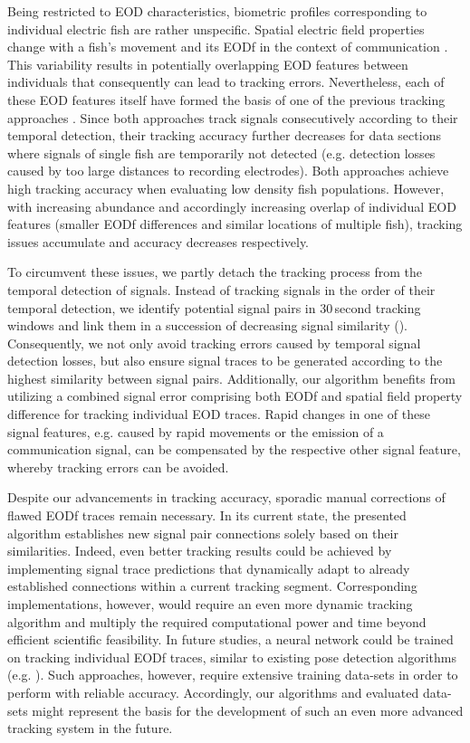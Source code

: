 Being restricted to EOD characteristics, biometric profiles corresponding to individual electric fish are rather unspecific. Spatial electric field properties change with a fish's movement \citep{Madhav2018} and its EODf in the context of communication \citep{Zupanc2002, Triefenbach2008, Smith2013}. This variability results in potentially overlapping EOD features between individuals that consequently can lead to tracking errors. Nevertheless, each of these EOD features itself have formed the basis of one of the previous tracking approaches \citep{Madhav2018, Henninger2020}. Since both approaches track signals consecutively according to their temporal detection, their tracking accuracy further decreases for data sections where signals of single fish are temporarily not detected (e.g. detection losses caused by too large distances to recording electrodes). Both approaches achieve high tracking accuracy when evaluating low density fish populations. However, with increasing abundance and accordingly increasing overlap of individual EOD features (smaller EODf differences and similar locations of multiple fish), tracking issues accumulate and accuracy decreases respectively.

To circumvent these issues, we partly detach the tracking process from the temporal detection of signals. Instead of tracking signals in the order of their temporal detection, we identify potential signal pairs in 30\,second tracking windows and link them in a succession of decreasing signal similarity (). Consequently, we not only avoid tracking errors caused by temporal signal detection losses, but also ensure signal traces to be generated according to the highest similarity between signal pairs. Additionally, our algorithm benefits from utilizing a combined signal error comprising both EODf and spatial field property difference for tracking individual EOD traces. Rapid changes in one of these signal features, e.g. caused by rapid movements or the emission of a communication signal, can be compensated by the respective other signal feature, whereby tracking errors can be avoided.

Despite our advancements in tracking accuracy, sporadic manual corrections of flawed EODf traces remain necessary. In its current state, the presented algorithm establishes new signal pair connections solely based on their similarities. Indeed, even better tracking results could be achieved by implementing signal trace predictions that dynamically adapt to already established connections within a current tracking segment. Corresponding implementations, however, would require an even more dynamic tracking algorithm and multiply the required computational power and time beyond efficient scientific feasibility. In future studies, a neural network could be trained on tracking individual EODf traces, similar to existing pose detection algorithms (e.g. \citealp{Mathis2018}). Such approaches, however,  require extensive training data-sets in order to perform with reliable accuracy. Accordingly, our algorithms and evaluated data-sets might represent the basis for the development of such an even more advanced tracking system in the future.

